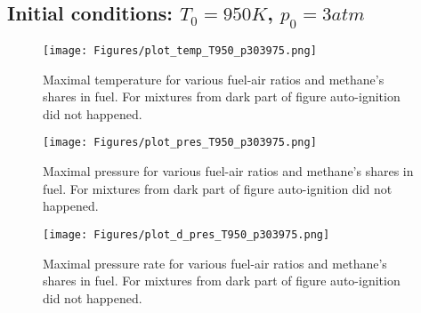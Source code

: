 \subsection{Initial conditions: $T_0=950K$, $p_0=3atm$}
\begin{figure}[H]
	\centering
	\texttt{[image: Figures/plot\_temp\_T950\_p303975.png]}
	\caption{Maximal temperature for various fuel-air ratios and methane's shares in fuel. For mixtures from dark part of figure auto-ignition did not happened.}
	\label{fig:T950p3_temp}
\end{figure}
\begin{figure}[H]
	\centering
	\texttt{[image: Figures/plot\_pres\_T950\_p303975.png]}
	\caption{Maximal pressure for various fuel-air ratios and methane's shares in fuel. For mixtures from dark part of figure auto-ignition did not happened.}
	\label{fig:T950p3_pres}
\end{figure}
\begin{figure}[H]
	\centering
	\texttt{[image: Figures/plot\_d\_pres\_T950\_p303975.png]}
	\caption{Maximal pressure rate for various fuel-air ratios and methane's shares in fuel. For mixtures from dark part of figure auto-ignition did not happened.}
	\label{fig:T950p3_rate}
\end{figure}